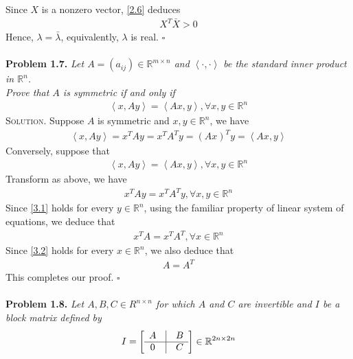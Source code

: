 \documentclass[a4paper,oneside]{book}
\numberwithin{equation}{chapter}
\begin{document}
Since $X$ is a nonzero vector, \eqref{2.6} deduces 
\begin{align}
{X^T}\bar X > 0
\end{align}
Hence, $\lambda =\bar{\lambda}$, equivalently, $\lambda$ is real. \hfill $\square$\\
\\
\textbf{Problem 1.7.} \textit{Let $A = \left( {{a_{ij}}} \right) \in {\mathbb{R}^{m \times n}}$ and $\left\langle { \cdot , \cdot } \right\rangle $ be the standard inner product in $\mathbb{R}^n$.\\
Prove that $A$ is symmetric if and only if}
\begin{align}
\left\langle {x,Ay} \right\rangle  = \left\langle {Ax,y} \right\rangle ,\forall x,y \in {\mathbb{R}^n}
\end{align}
\textsc{Solution.} Suppose $A$ is symmetric and $x,y \in \mathbb{R}^n$, we have
\begin{align}
\left\langle {x,Ay} \right\rangle  = {x^T}Ay = {x^T}{A^T}y = {\left( {Ax} \right)^T}y = \left\langle {Ax,y} \right\rangle 
\end{align}
Conversely, suppose that 
\begin{align}
\left\langle {x,Ay} \right\rangle  = \left\langle {Ax,y} \right\rangle ,\forall x,y \in {\mathbb{R}^n}
\end{align}
Transform as above, we have
\begin{align}
\label{3.1}
{x^T}Ay = {x^T}{A^T}y,\forall x,y \in {\mathbb{R}^n}
\end{align}
Since \eqref{3.1} holds for every $y \in \mathbb{R}^n$, using the familiar property of linear system of equations, we deduce that
\begin{align}
\label{3.2}
{x^T}A = {x^T}{A^T},\forall x \in {\mathbb{R}^n}
\end{align}
Since \eqref{3.2} holds for every $x \in \mathbb{R}^n$, we also deduce that
\begin{align}
A = {A^T}
\end{align}
This completes our proof. \hfill $\square$\\
\\
\textbf{Problem 1.8.} \textit{Let $A,B,C \in {R^{n \times n}}$ for which $A$ and $C$ are invertible and $I$ be a block matrix defined by}
\begin{align}
I = \left[ {\begin{array}{*{20}{c}}
A&\vline& B\\
\hline
0&\vline& C
\end{array}} \right] \in {\mathbb{R}^{2n \times 2n}}
\end{align}
\end{document}

